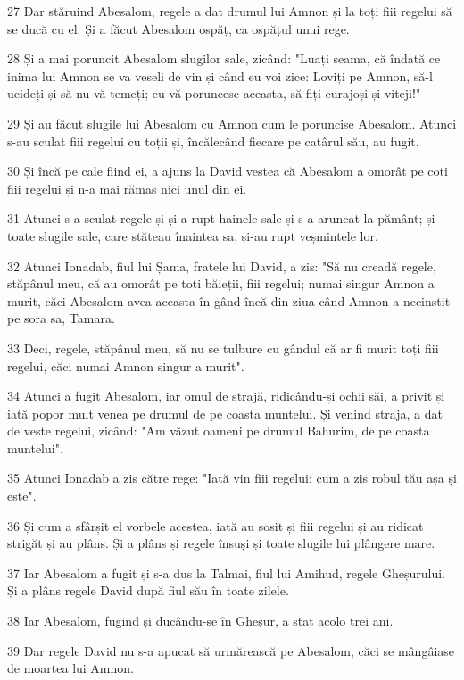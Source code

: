 \par 27 Dar stăruind Abesalom, regele a dat drumul lui Amnon și la toți fiii regelui să se ducă cu el. Și a făcut Abesalom ospăț, ca ospățul unui rege.
\par 28 Și a mai poruncit Abesalom slugilor sale, zicând: "Luați seama, că îndată ce inima lui Amnon se va veseli de vin și când eu voi zice: Loviți pe Amnon, să-l ucideți și să nu vă temeți; eu vă poruncesc aceasta, să fiți curajoși și viteji!"
\par 29 Și au făcut slugile lui Abesalom cu Amnon cum le poruncise Abesalom. Atunci s-au sculat fiii regelui cu toții și, încălecând fiecare pe catârul său, au fugit.
\par 30 Și încă pe cale fiind ei, a ajuns la David vestea că Abesalom a omorât pe coti fiii regelui și n-a mai rămas nici unul din ei.
\par 31 Atunci s-a sculat regele și și-a rupt hainele sale și s-a aruncat la pământ; și toate slugile sale, care stăteau înaintea sa, și-au rupt veșmintele lor.
\par 32 Atunci Ionadab, fiul lui Șama, fratele lui David, a zis: "Să nu creadă regele, stăpânul meu, că au omorât pe toți băieții, fiii regelui; numai singur Amnon a murit, căci Abesalom avea aceasta în gând încă din ziua când Amnon a necinstit pe sora sa, Tamara.
\par 33 Deci, regele, stăpânul meu, să nu se tulbure cu gândul că ar fi murit toți fiii regelui, căci numai Amnon singur a murit".
\par 34 Atunci a fugit Abesalom, iar omul de strajă, ridicându-și ochii săi, a privit și iată popor mult venea pe drumul de pe coasta muntelui. Și venind straja, a dat de veste regelui, zicând: "Am văzut oameni pe drumul Bahurim, de pe coasta muntelui".
\par 35 Atunci Ionadab a zis către rege: "Iată vin fiii regelui; cum a zis robul tău așa și este".
\par 36 Și cum a sfârșit el vorbele acestea, iată au sosit și fiii regelui și au ridicat strigăt și au plâns. Și a plâns și regele însuși și toate slugile lui plângere mare.
\par 37 Iar Abesalom a fugit și s-a dus la Talmai, fiul lui Amihud, regele Gheșurului. Și a plâns regele David după fiul său în toate zilele.
\par 38 Iar Abesalom, fugind și ducându-se în Gheșur, a stat acolo trei ani.
\par 39 Dar regele David nu s-a apucat să urmărească pe Abesalom, căci se mângâiase de moartea lui Amnon.

